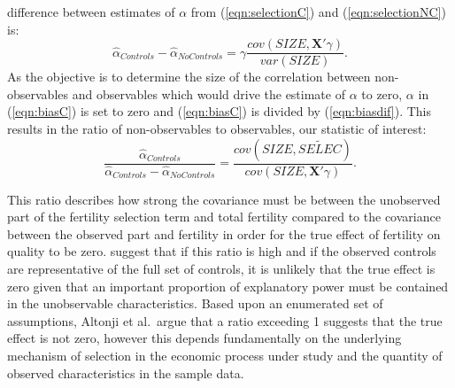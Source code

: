 \documentclass{article}[11pt,subeqn]
\newcommand{\vect}[1]{\mathbf{#1}}
\begin{document}
\begin{spacing}{1.5}
difference between estimates of $\alpha$ from (\ref{eqn:selectionC}) and (\ref{eqn:selectionNC}) is:
\begin{equation}
 \label{eqn:biasdif}
\hat\alpha_{Controls} - \hat\alpha_{NoControls} = \gamma\frac{cov(SIZE,\vect{X}'\gamma)}{var(SIZE)}.
\end{equation}
As the objective is to determine the size of the correlation between non-observables and observables which would drive the estimate of $\alpha$ to zero, $\alpha$ in (\ref{eqn:biasC})
is set to zero and (\ref{eqn:biasC}) is divided by (\ref{eqn:biasdif}).  This results in the ratio of non-observables to observables, our statistic of interest:
\begin{equation}
 \label{eqn:Aratio}
\frac{\hat\alpha_{Controls}}{\hat\alpha_{Controls} - \hat\alpha_{NoControls}}=\frac{cov(SIZE,\widetilde{SELEC})}{cov(SIZE,\vect{X}'\gamma)}.
\end{equation}

This ratio describes how strong the covariance must be between the unobserved part of the fertility selection term and total fertility compared to the covariance between the observed
part and fertility in order for the true effect of fertility on quality to be zero.  \citet{Altonjietal2005} suggest that if this ratio is high and if the observed controls are
representative of the full set of controls, it is unlikely that the true effect is zero given that an important proportion of explanatory power must be contained in the unobservable 
characteristics.  Based upon an enumerated set of assumptions, Altonji et al.\ argue that a ratio exceeding 1 suggests that the true effect is not zero, however this depends 
fundamentally on the underlying mechanism of selection in the economic process under study and the quantity of observed characteristics in the sample data.


\end{spacing}
\end{document}
